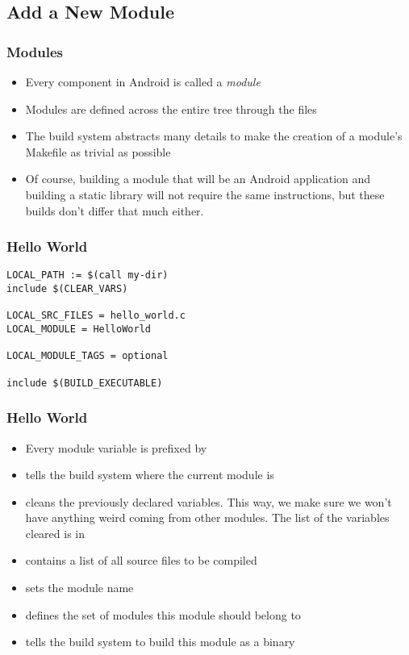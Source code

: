 \subsection{Add a New Module}

\begin{frame}
  \frametitle{Modules}
  \begin{itemize}
  \item Every component in Android is called a \emph{module}
  \item Modules are defined across the entire tree through the
     files
  \item The build system abstracts many details to make the
    creation of a module's Makefile as trivial as possible
  \item Of course, building a module that will be an Android
    application and building a static library will not require the same
    instructions, but these builds don't differ that much either.
  \end{itemize}
\end{frame}

\begin{frame}[fragile]
  \frametitle{Hello World}
\begin{verbatim}
LOCAL_PATH := $(call my-dir)
include $(CLEAR_VARS)

LOCAL_SRC_FILES = hello_world.c
LOCAL_MODULE = HelloWorld

LOCAL_MODULE_TAGS = optional

include $(BUILD_EXECUTABLE)
\end{verbatim}
\end{frame}

\begin{frame}
  \frametitle{Hello World}
  \begin{itemize}
  \item Every module variable is prefixed by 
  \item {} tells the build system where the current
    module is
  \item {} cleans the previously declared
     variables. This way, we make sure we won't have
    anything weird coming from other modules. The list of the
    variables cleared is in 
  \item {} contains a list of all source
    files to be compiled
  \item {} sets the module name
  \item {} defines the set of modules this module
    should belong to
  \item {} tells the build system to
    build this module as a binary
  \end{itemize}
\end{frame}

